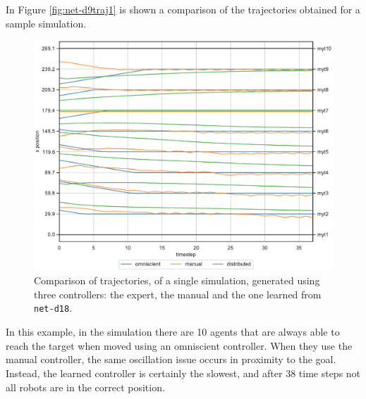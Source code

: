In Figure \ref{fig:net-d9traj1} is shown a comparison of the trajectories obtained 
for a sample simulation.
\begin{figure}[!htb]
	\centering
	\includegraphics[width=.65\textwidth]{contents/images/net-d18/animation-distributed}%
	\caption[Evaluation of the trajectories obtained with variable 
	agents.]{Comparison of trajectories, of a single simulation, generated using 
		three controllers: the expert, the manual and the one learned from 
		\texttt{net-d18}.}
	\label{fig:net-d18traj1}
\end{figure}  
In this example, in the simulation there are 10 agents that are always able to 
reach the target when moved using an omniscient controller.
When they use the manual controller, the same oscillation issue occurs in 
proximity  to the goal. Instead, the learned controller is certainly the slowest, and 
after 38 time steps not all robots are in the correct position.

